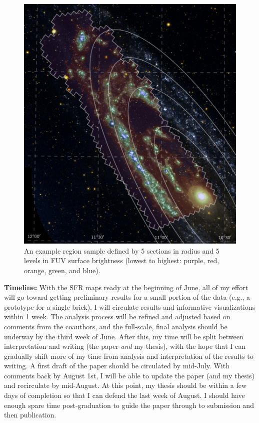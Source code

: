 \documentclass[preprint,11pt]{aastex}
\begin{document}
\begin{figure}
\centering
\includegraphics[scale=0.9]{regions.pdf}
\caption{An example region sample defined by 5 sections in radius and 5 levels
    in FUV surface brightness (lowest to highest: purple, red, orange, green,
    and blue).
}
\label{fig:regions}
\end{figure}

\textbf{Timeline:} With the SFR maps ready at the beginning of June, all of my
effort will go toward getting preliminary results for a small portion of the
data (e.g., a prototype for a single brick). I will circulate results and
informative visualizations within 1 week. The analysis process will be refined
and adjusted based on comments from the coauthors, and the full-scale, final
analysis should be underway by the third week of June. After this, my time will
be split between interpretation and writing (the paper \emph{and} my thesis),
with the hope that I can gradually shift more of my time from analysis and
interpretation of the results to writing. A first draft of the paper should be
circulated by mid-July. With comments back by August 1st, I will be able to
update the paper (and my thesis) and recirculate by mid-August. At this point,
my thesis should be within a few days of completion so that I can defend the
last week of August. I should have enough spare time post-graduation to guide
the paper through to submission and then publication.
\end{document}
